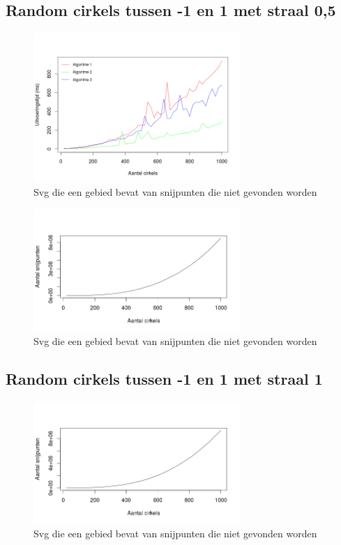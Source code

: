 \documentclass[11pt,a4paper]{article}
\begin{document}
\subsection{Random cirkels tussen -1 en 1 met straal 0,5}
\begin{figure}[H]
\centering
\includegraphics[width=0.7\textwidth]{uitvoeringstijd_05.png}
\caption*{Svg die een gebied bevat van snijpunten die niet gevonden worden}
\end{figure}

\begin{figure}[H]
\centering
\includegraphics[width=0.7\textwidth]{snijpunten_05.png}
\caption*{Svg die een gebied bevat van snijpunten die niet gevonden worden}
\end{figure}

\subsection{Random cirkels tussen -1 en 1 met straal 1}
\begin{figure}[H]
\centering
\includegraphics[width=0.7\textwidth]{uitvoeringstijd_10.png}
\caption*{Svg die een gebied bevat van snijpunten die niet gevonden worden}
\end{figure}
\end{document}
